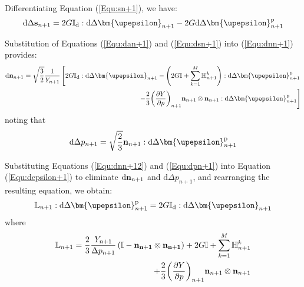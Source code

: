 Differentiating Equation (\ref{Equ:sn+1}), we have:
\begin{equation}
\label{Equ:dsn+1}
{\text{d}}\Delta {{\bf{s}}_{n + 1}} = 2G{\mathbb{I}_{\rm{d}}}:{\text{d}}\Delta {{\bm{\upepsilon }}_{n + 1}} - 2G{\text{d}}\Delta {\bm{\upepsilon }}_{n + 1}^{\rm{p}}
\end{equation}

Substitution of Equations (\ref{Equ:dan+1}) and (\ref{Equ:dsn+1}) into (\ref{Equ:dnn+1}) provides:
\begin{equation}
\label{Equ:dnn+12}
\begin{aligned}
{\text{d}}{{\bf{n}}_{n + 1}} = \sqrt {\frac{3}{2}} \frac{1}{{{Y_{n + 1}}}} \left[ {2G{\mathbb{I}_{\rm{d}}}:{\text{d}}\Delta {{\bm{\upepsilon }}_{n + 1}} - \left( {2G\mathbb{I} + \sum\limits_{k = 1}^M {\mathbb{H}_{n + 1}^k} } \right):{\text{d}}\Delta {\bm{\upepsilon }}_{n + 1}^{\rm{p}}} \right.\\
\left. { - \frac{2}{3}{{\left( {\frac{{\partial Y}}{{\partial p}}} \right)}_{n + 1}}{{\bf{n}}_{n + 1}} \otimes {{\bf{n}}_{n + 1}}:{\text{d}}\Delta {\bm{\upepsilon }}_{n + 1}^{\rm{p}}}\right]
\end{aligned}
\end{equation}
noting that
\begin{equation}
\label{Equ:dpn+1}
{\text{d}}\Delta {p_{n + 1}} = \sqrt {\frac{2}{3}} {{\bf{n}}_{n + 1}}:{\text{d}}\Delta {\bm{\upepsilon }}_{n + 1}^{\rm{p}}
\end{equation}

Substituting Equations (\ref{Equ:dnn+12}) and (\ref{Equ:dpn+1}) into Equation (\ref{Equ:depsilon+1}) to eliminate ${\text{d}}{{\bf{n}}_{n + 1}}$ and ${\text{d}}\Delta {p_{n + 1}}$, and rearranging the resulting equation, we obtain:
\begin{equation}
{\mathbb{L}_{n + 1}}:{\text{d}}\Delta {\bm{\upepsilon }}_{n + 1}^{\rm{p}} = 2G{\mathbb{I}_{\rm{d}}}:{\text{d}}\Delta {{\bm{\upepsilon }}_{n + 1}}
\end{equation}
where
\begin{equation}
\label{Equ:Ln+1}
\begin{aligned}
\mathbb{L}_{n + 1} = \frac{2}{3}\frac{Y_{n + 1}}{\Delta {p_{n + 1}}} \left( \mathbb{I} - \bf{n}_{n + 1} \otimes \bf{n}_{n + 1} \right) + 2G\mathbb{I} + \sum \limits_{k = 1}^M {\mathbb{H}_{n + 1}^k} \\
   + \frac{2}{3}{{\left( {\frac{{\partial Y}}{{\partial p}}} \right)}_{n + 1}}{{\bf{n}}_{n + 1}} \otimes {{\bf{n}}_{n + 1}}
\end{aligned}
\end{equation}

